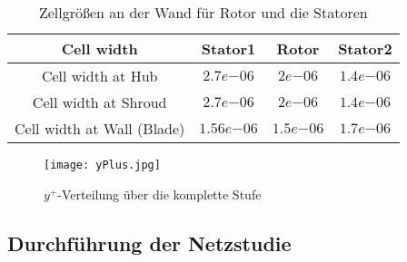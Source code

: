 \begin{table}[H]
\centering
\begin{tabular}[t]{cccc}
\toprule
 Cell width  & Stator1 & Rotor & Stator2  \\
\midrule
Cell width at Hub & $2.7e{-06}$ & $2e{-06}$ & $1.4e{-06}$\\
Cell width at Shroud & $2.7e{-06}$ & $2e{-06}$ & $1.4e{-06}$ \\
Cell width at Wall (Blade) & $1.56e{-06}$ & $1.5e{-06}$ & $1.7e{-06}$ \\
\bottomrule
\end{tabular}
\caption{Zellgrößen an der Wand für Rotor und die Statoren} \label{cellWidths}
\end{table}

\begin{figure}[H]
	\centering
    
	\texttt{[image: yPlus.jpg]}
	\caption{$y^+$-Verteilung über die komplette Stufe} \label{imgYplusWerte}
\end{figure}

\subsection{Durchführung der Netzstudie}

